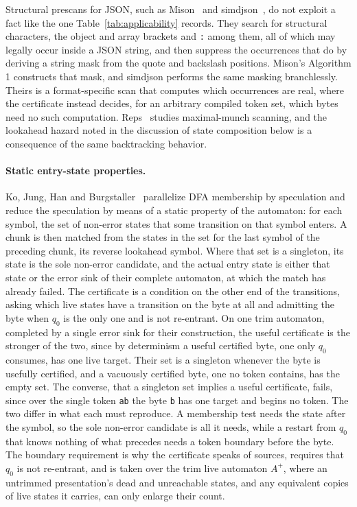 \documentclass[11pt,a4paper]{article}
\theoremstyle{definition}
\theoremstyle{plain}
\newcommand{\code}[1]{\texttt{#1}}
\begin{document}
Structural prescans for JSON, such as Mison~\cite{li2017mison} and simdjson~\cite{langdale2019simdjson}, do not exploit
a fact like the one Table~\ref{tab:applicability} records. They search for structural characters, the object and array
brackets and \code{:} among them, all of which may legally occur inside a JSON string, and then suppress the occurrences
that do by deriving a string mask from the quote and backslash positions. Mison's Algorithm 1 constructs that mask, and
simdjson performs the same masking branchlessly. Theirs is a format-specific scan that computes which occurrences are
real, where the certificate instead decides, for an arbitrary compiled token set, which bytes need no such computation.
Reps~\cite{reps1998maximal} studies maximal-munch scanning, and the lookahead hazard noted in the discussion of state
composition below is a consequence of the same backtracking behavior.

\paragraph{Static entry-state properties.} Ko, Jung, Han and Burgstaller~\cite{ko2014speculative} parallelize DFA
membership by speculation and reduce the speculation by means of a static property of the automaton: for each symbol,
the set of non-error states that some transition on that symbol enters. A chunk is then matched from the states in the
set for the last symbol of the preceding chunk, its reverse lookahead symbol. Where that set is a singleton, its state
is the sole non-error candidate, and the actual entry state is either that state or the error sink of their complete
automaton, at which the match has already failed. The certificate is a condition on the other end of the transitions,
asking which live states have a transition on the byte at all and admitting the byte when $q_0$ is the only one and is
not re-entrant. On one trim automaton, completed by a single error sink for their construction, the useful certificate
is the stronger of the two, since by determinism a useful certified byte, one only $q_0$ consumes, has one live target.
Their set is a singleton whenever the byte is usefully certified, and a vacuously certified byte, one no token contains,
has the empty set. The converse, that a singleton set implies a useful certificate, fails, since over the single token
\code{ab} the byte \code{b} has one target and begins no token. The two differ in what each must reproduce. A membership
test needs the state after the symbol, so the sole non-error candidate is all it needs, while a restart from $q_0$ that
knows nothing of what precedes needs a token boundary before the byte. The boundary requirement is why the certificate
speaks of sources, requires that $q_0$ is not re-entrant, and is taken over the trim live automaton $A^+$, where an
untrimmed presentation's dead and unreachable states, and any equivalent copies of live states it carries, can only
enlarge their count.
\end{document}
